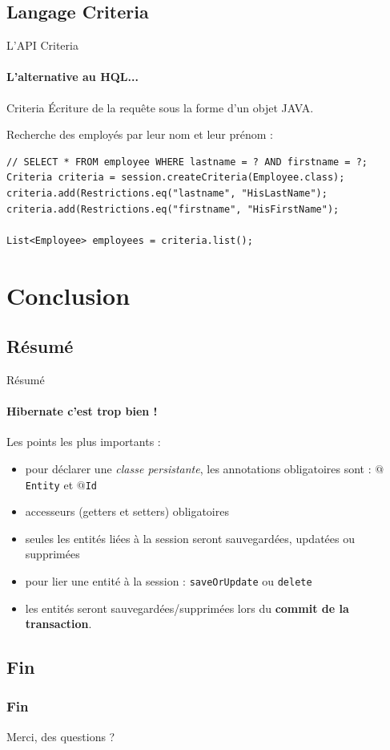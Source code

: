 \documentclass[compress]{beamer}%
\begin{document}
\subsection{Langage Criteria}

\begin{frame}[fragile]{L'API Criteria}
	\framesubtitle{L'alternative au HQL...}

	\begin{block}{Criteria}
		Écriture de la requête sous la forme d'un objet JAVA.
	\end{block}		
	
	\pause
	Recherche des employés par leur nom et leur prénom :
	\begin{lstlisting}
// SELECT * FROM employee WHERE lastname = ? AND firstname = ?;
Criteria criteria = session.createCriteria(Employee.class);
criteria.add(Restrictions.eq("lastname", "HisLastName");
criteria.add(Restrictions.eq("firstname", "HisFirstName");

List<Employee> employees = criteria.list();
	\end{lstlisting}

\end{frame}
	
	
	
\section{Conclusion}

\subsection{Résumé}
\begin{frame}{Résumé}
	\framesubtitle{Hibernate c'est trop bien !}
	Les points les plus importants :
	\begin{itemize}[<+->]
		\item pour déclarer une  \emph{classe persistante}, les annotations obligatoires sont : \texttt{$@$Entity} et \texttt{$@$Id}
		\item accesseurs (getters et setters) obligatoires
		\item seules les entités liées à la session seront sauvegardées, updatées ou supprimées
		\item pour lier une entité à la session : \texttt{saveOrUpdate} ou \texttt{delete}
		\item les entités seront sauvegardées/supprimées lors du \textbf{commit de la transaction}.
	\end{itemize}
\end{frame}
	
\subsection{Fin}
\begin{frame}
	\frametitle{Fin}
	\begin{center}
		\huge
		Merci, des questions ?
	\end{center}
\end{frame}
\end{document}
